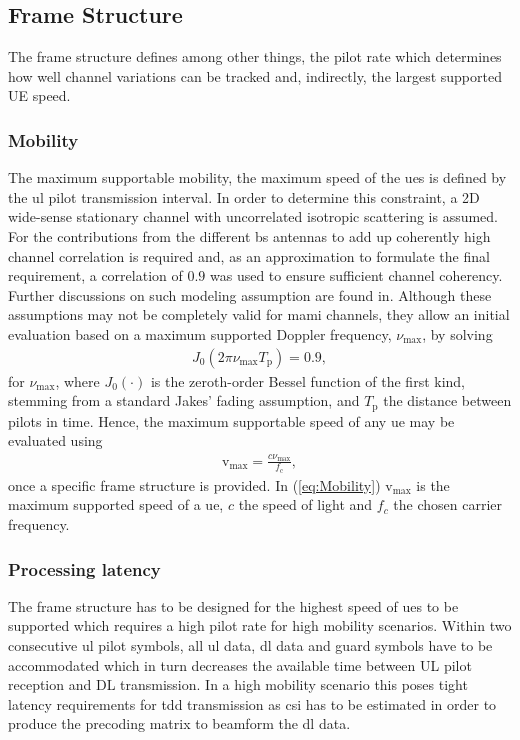 \documentclass[journal]{IEEEtran}
\begin{document}
\subsection{Frame Structure}
The frame structure defines among other things, the pilot rate which determines how well channel variations can be tracked and, indirectly, the largest supported UE speed.
%

\subsubsection{Mobility}
The maximum supportable mobility, \eg the maximum speed of the \glspl{ue} is defined by the \gls{ul} pilot transmission interval.
%
%
In order to determine this constraint, a 2D wide-sense stationary channel with uncorrelated isotropic scattering is assumed.
For the contributions from the different \gls{bs} antennas to add up coherently high channel correlation is required and, as an approximation to formulate the final requirement, a correlation of $0.9$ was used to ensure sufficient channel coherency.
Further discussions on such modeling assumption are found in\cite{molisch2010wireless}.
Although these assumptions may not be completely valid for \gls{mami} channels, they allow an initial evaluation based on a maximum supported Doppler frequency, $\nu_\text{max}$, by solving 
\begin{align}
J_\text{0}(2\pi\nu_\text{max}T_\text{p}) = 0.9,\label{eq:bessel}
\end{align}
for $\nu_\text{max}$, where $J_\text{0}(\cdotp)$ is the zeroth-order Bessel function of the first kind, stemming from a standard Jakes' fading assumption, and $T_\text{p}$ the distance between pilots in time.
Hence, the maximum supportable speed of any \gls{ue} may be evaluated using
\begin{align}
\text{v}_\text{max}= \frac{c\nu_\text{max}}{f_\text{c}},\label{eq:Mobility}
\end{align}
once a specific frame structure is provided.
In (\ref{eq:Mobility}) $\text{v}_\text{max}$ is the maximum supported speed of a \gls{ue}, $c$ the speed of light and $f_c$ the chosen carrier frequency.
\subsubsection{Processing latency}
%
The frame structure has to be designed for the highest speed of \glspl{ue} to be supported which requires a high pilot rate for high mobility scenarios. 
Within two consecutive \gls{ul} pilot symbols, all \gls{ul} data, \gls{dl} data and guard symbols have to be accommodated	 which in turn decreases the available time between UL pilot reception and DL transmission. 
In a high mobility scenario this poses tight latency requirements for \gls{tdd} transmission as \gls{csi} has to be estimated in order to produce the precoding matrix to beamform the \gls{dl} data.
%
\end{document}
